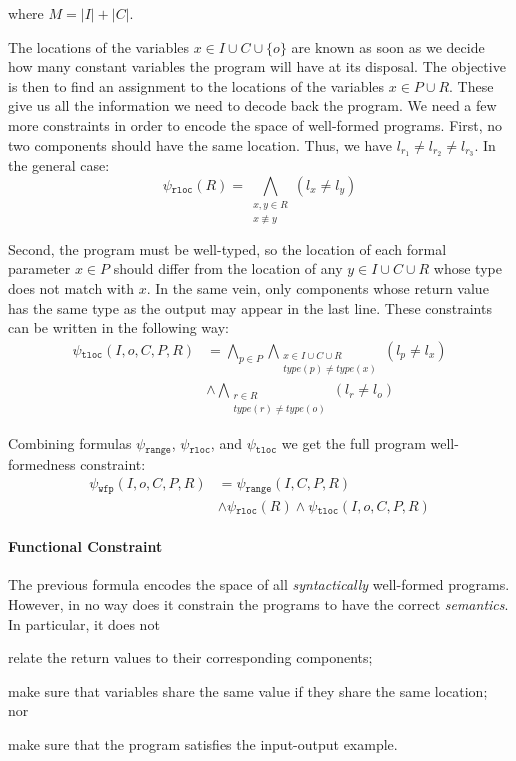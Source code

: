 \noindent
where $M = |I| + |C|$.
 
The locations of the variables $x \in I \cup C \cup \{o\}$ are known as soon as
we decide how many constant variables the program will have at its disposal. The
objective is then to find an assignment to the locations of the variables $x \in
P \cup R$. These give us all the information we need to decode back the program.
We need a few more constraints in order to encode the space of well-formed
programs. First, no two components should have the same location. Thus,
we have $l_{r_1} \neq l_{r_2} \neq l_{r_3}$. In the general case:
%
\[
  \psi{}_{\mathtt{rloc}}(R) =
  \bigwedge_{\substack{x, y \in R\\ x \not\equiv y}} (l_{x} \neq l_{y}) 
\]

\noindent
Second, the program must be well-typed, so the location of each formal parameter
$x \in P$ should differ from the location of any $y \in I \cup C \cup R$ whose
type does not match with $x$. In the same vein, only components whose return
value has the same type as the output may appear in the last line. These
constraints can be written in the following way:
%
\begin{align*}
  \psi{}_{\mathtt{tloc}}(I, o, C, P, R) &=
  \bigwedge_{p \in P}
  \bigwedge_{\substack{x \in I \cup C \cup R \\ type(p) \neq type(x)}}
  (l_p \neq l_x)\\
  &\wedge
  \bigwedge_{\substack{r \in R \\ type(r) \neq type(o)}}
  (l_r \neq l_o)
\end{align*}

Combining formulas $\psi{}_{\mathtt{range}}$, $\psi{}_{\mathtt{rloc}}$, and
$\psi{}_{\mathtt{tloc}}$ we get the full program well-formedness constraint:
%
\begin{align*}
  \psi{}_{\mathtt{wfp}}(I, o, C, P, R) &=
  \psi{}_{\mathtt{range}}(I, C, P, R)\\
  &\wedge \psi{}_{\mathtt{rloc}}(R) \wedge \psi{}_{\mathtt{tloc}}(I, o, C, P, R)
\end{align*}

\paragraph{Functional Constraint}
\label{sec:functional-constraint}

The previous formula encodes the space of all \textit{syntactically} well-formed
programs. However, in no way does it constrain the programs to have the correct
\textit{semantics}.
In particular, it does not
\begin{enumerate*}[(1)]
\item \label{itm:fc-one} relate the return values to their corresponding components;
\item \label{itm:fc-two} make sure that variables share the same value if they share the same
location; nor
\item \label{itm:fc-three} make sure that the program satisfies the input-output example.
\end{enumerate*}

